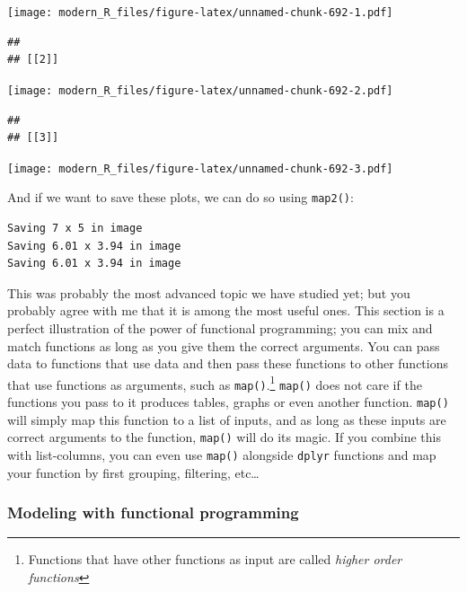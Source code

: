 \documentclass[]{gitbook}
\newenvironment{Shaded}{\begin{snugshade}}{\end{snugshade}}
\newcommand{\KeywordTok}[1]{\textcolor[rgb]{0.13,0.29,0.53}{\textbf{#1}}}
\newcommand{\NormalTok}[1]{#1}
\newcommand{\OperatorTok}[1]{\textcolor[rgb]{0.81,0.36,0.00}{\textbf{#1}}}
\newcommand{\StringTok}[1]{\textcolor[rgb]{0.31,0.60,0.02}{#1}}
\let\rmarkdownfootnote\footnote%
\def\footnote{\protect\rmarkdownfootnote}
\begin{document}
\texttt{[image: modern\_R\_files/figure-latex/unnamed-chunk-692-1.pdf]}

\begin{verbatim}
## 
## [[2]]
\end{verbatim}

\texttt{[image: modern\_R\_files/figure-latex/unnamed-chunk-692-2.pdf]}

\begin{verbatim}
## 
## [[3]]
\end{verbatim}

\texttt{[image: modern\_R\_files/figure-latex/unnamed-chunk-692-3.pdf]}

And if we want to save these plots, we can do so using \texttt{map2()}:

\begin{Shaded}
\end{Shaded}

\begin{verbatim}
Saving 7 x 5 in image
Saving 6.01 x 3.94 in image
Saving 6.01 x 3.94 in image
\end{verbatim}

This was probably the most advanced topic we have studied yet; but you probably agree with me that
it is among the most useful ones. This section is a perfect illustration of the power of functional
programming; you can mix and match functions as long as you give them the correct arguments.
You can pass data to functions that use data and then pass these functions to other functions that
use functions as arguments, such as \texttt{map()}.\footnote{Functions that have other functions as input are
  called \emph{higher order functions}} \texttt{map()} does not care if the functions you pass to it produces tables,
graphs or even another function. \texttt{map()} will simply map this function to a list of inputs, and as
long as these inputs are correct arguments to the function, \texttt{map()} will do its magic. If you
combine this with list-columns, you can even use \texttt{map()} alongside \texttt{dplyr} functions and map your
function by first grouping, filtering, etc\ldots{}

\hypertarget{modeling-with-functional-programming}{%
\subsubsection{Modeling with functional programming}\label{modeling-with-functional-programming}}
\end{document}
